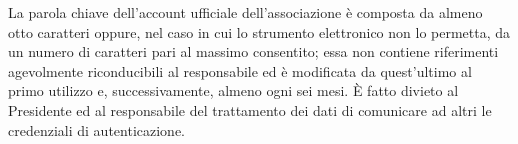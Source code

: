 La parola chiave dell’account ufficiale dell’associazione è composta da
almeno otto caratteri oppure, nel caso in cui lo strumento elettronico non
lo permetta, da un numero di caratteri pari al massimo consentito; essa non
contiene riferimenti agevolmente riconducibili al responsabile ed è
modificata da quest’ultimo al primo utilizzo e, successivamente, almeno ogni
sei mesi. È fatto divieto al Presidente ed al responsabile del trattamento
dei dati di comunicare ad altri le credenziali di autenticazione.
